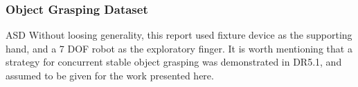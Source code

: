 
\subsubsection{Object Grasping Dataset}
\label{sec:ObjectGraspingDataset}

ASD
Without loosing generality, this report used fixture device as the supporting hand, and a 7 DOF robot as the exploratory finger. It is worth mentioning that a strategy for concurrent stable object grasping was demonstrated in DR5.1, and assumed to be given for the work presented here.

